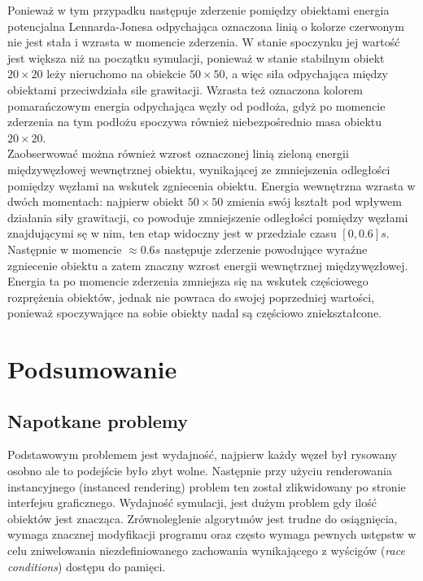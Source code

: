 \documentclass[12pt, letterpaper]{report}
\begin{document}
    Ponieważ w tym przypadku następuje zderzenie pomiędzy obiektami energia potencjalna Lennarda-Jonesa odpychająca
    oznaczona linią o kolorze czerwonym nie jest stała i wzrasta w momencie zderzenia. W stanie spoczynku jej wartość
    jest większa niż na początku symulacji, ponieważ w stanie stabilnym obiekt $20 \times 20$ leży nieruchomo na obiekcie
    $50 \times 50$, a więc siła odpychająca między obiektami przeciwdziała sile grawitacji. 
    Wzrasta też oznaczona kolorem pomarańczowym energia odpychająca węzły od podłoża, gdyż po momencie zderzenia na 
    tym podłożu spoczywa również niebezpośrednio masa  obiektu $20 \times 20$. \\
    
    Zaobserwować można również wzrost oznaczonej linią zieloną energii międzywęzłowej wewnętrznej obiektu, wynikającej ze 
    zmniejszenia odległości pomiędzy węzłami na wskutek zgniecenia obiektu. Energia wewnętrzna wzrasta w dwóch momentach: 
    najpierw obiekt $50 \times 50$ zmienia swój kształt pod wpływem działania siły grawitacji, co powoduje zmniejszenie 
    odległości pomiędzy węzłami znajdującymi sę w nim, ten etap widoczny jest w przedziale czasu $[0, 0.6] s$. 
    Następnie w momencie $\approx 0.6 s$ następuje zderzenie powodujące wyraźne zgniecenie obiektu a zatem znaczny wzrost
    energii wewnętrznej międzywęzłowej. Energia ta po momencie zderzenia zmniejsza się na wskutek częściowego rozprężenia
    obiektów, jednak nie powraca do swojej poprzedniej wartości, ponieważ spoczywające na sobie obiekty nadal są 
    częściowo zniekształcone.

\chapter{Podsumowanie}
    \section{Napotkane problemy}
    Podstawowym problemem jest wydajność, najpierw każdy węzeł był rysowany osobno ale to podejście 
    było zbyt wolne. Następnie przy użyciu renderowania instancyjnego (instanced rendering) 
    problem ten został zlikwidowany po 
    stronie interfejsu graficznego. Wydajność symulacji, jest dużym problem gdy ilość obiektów jest znacząca. 
    Zrównoleglenie algorytmów jest trudne do osiągnięcia, wymaga znacznej modyfikacji programu oraz często 
    wymaga pewnych ustępstw w celu zniwelowania niezdefiniowanego zachowania wynikającego z wyścigów 
    (\emph{race conditions}) dostępu do pamięci.
\end{document}
